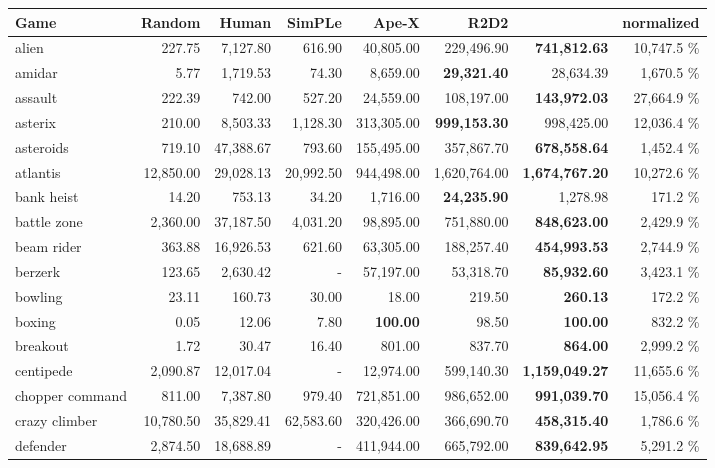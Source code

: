 \begin{center}\begin{tabularx}{0.900000\textwidth}{X| r r r r r r r}
\toprule
Game & Random & Human & SimPLe \cite{kaiser:simple} & Ape-X \cite{apex} & R2D2 \cite{r2d2} & \muzero{} & \muzero{} normalized \\
\midrule
alien &227.75 & 7,127.80 & 616.90 & 40,805.00 & 229,496.90 & \textbf{741,812.63} & 10,747.5 \%\\
amidar &5.77 & 1,719.53 & 74.30 & 8,659.00 & \textbf{29,321.40} & 28,634.39 & 1,670.5 \%\\
assault &222.39 & 742.00 & 527.20 & 24,559.00 & 108,197.00 & \textbf{143,972.03} & 27,664.9 \%\\
asterix &210.00 & 8,503.33 & 1,128.30 & 313,305.00 & \textbf{999,153.30} & 998,425.00 & 12,036.4 \%\\
asteroids &719.10 & 47,388.67 & 793.60 & 155,495.00 & 357,867.70 & \textbf{678,558.64} & 1,452.4 \%\\
atlantis &12,850.00 & 29,028.13 & 20,992.50 & 944,498.00 & 1,620,764.00 & \textbf{1,674,767.20} & 10,272.6 \%\\
bank heist &14.20 & 753.13 & 34.20 & 1,716.00 & \textbf{24,235.90} & 1,278.98 & 171.2 \%\\
battle zone &2,360.00 & 37,187.50 & 4,031.20 & 98,895.00 & 751,880.00 & \textbf{848,623.00} & 2,429.9 \%\\
beam rider &363.88 & 16,926.53 & 621.60 & 63,305.00 & 188,257.40 & \textbf{454,993.53} & 2,744.9 \%\\
berzerk &123.65 & 2,630.42 & - & 57,197.00 & 53,318.70 & \textbf{85,932.60} & 3,423.1 \%\\
bowling &23.11 & 160.73 & 30.00 & 18.00 & 219.50 & \textbf{260.13} & 172.2 \%\\
boxing &0.05 & 12.06 & 7.80 & \textbf{100.00} & 98.50 & \textbf{100.00} & 832.2 \%\\
breakout &1.72 & 30.47 & 16.40 & 801.00 & 837.70 & \textbf{864.00} & 2,999.2 \%\\
centipede &2,090.87 & 12,017.04 & - & 12,974.00 & 599,140.30 & \textbf{1,159,049.27} & 11,655.6 \%\\
chopper command &811.00 & 7,387.80 & 979.40 & 721,851.00 & 986,652.00 & \textbf{991,039.70} & 15,056.4 \%\\
crazy climber &10,780.50 & 35,829.41 & 62,583.60 & 320,426.00 & 366,690.70 & \textbf{458,315.40} & 1,786.6 \%\\
defender &2,874.50 & 18,688.89 & - & 411,944.00 & 665,792.00 & \textbf{839,642.95} & 5,291.2 \%\\

\end{tabularx}
\end{center}
